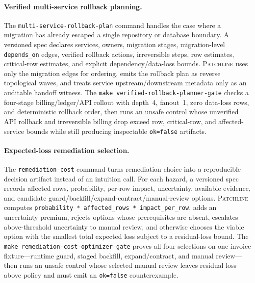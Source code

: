 \documentclass[11pt]{article}
\newcommand{\tool}{\textsc{Patchline}}
\newcommand{\code}[1]{\texttt{#1}}
\newcommand{\gate}[1]{\texttt{make #1}}
\begin{document}
\paragraph{Verified multi-service rollback planning.} The \code{multi-service-rollback-plan} command
handles the case where a migration has already escaped a single repository or database boundary. A
versioned spec declares services, owners, migration stages, migration-level \code{depends\_on} edges,
verified rollback actions, irreversible steps, row estimates, critical-row estimates, and explicit
dependency/data-loss bounds. \tool{} uses only the migration edges for ordering, emits the rollback plan
as reverse topological waves, and treats service upstream/downstream metadata only as an auditable
handoff witness. The \gate{verified-rollback-planner-gate} checks a four-stage billing/ledger/API
rollout with depth~4, fanout~1, zero data-loss rows, and deterministic rollback order, then runs an
unsafe control whose unverified API rollback and irreversible billing drop exceed row, critical-row, and
affected-service bounds while still producing inspectable \code{ok=false} artifacts.

\paragraph{Expected-loss remediation selection.} The \code{remediation-cost} command turns remediation
choice into a reproducible decision artifact instead of an intuition call. For each hazard, a versioned
spec records affected rows, probability, per-row impact, uncertainty, available evidence, and candidate
guard/backfill/expand-contract/manual-review options. \tool{} computes
\code{probability * affected\_rows * impact\_per\_row}, adds an uncertainty premium, rejects options
whose prerequisites are absent, escalates above-threshold uncertainty to manual review, and otherwise
chooses the viable option with the smallest total expected loss subject to a residual-loss bound. The
\gate{remediation-cost-optimizer-gate} proves all four selections on one invoice fixture---runtime
guard, staged backfill, expand/contract, and manual review---then runs an unsafe control whose selected
manual review leaves residual loss above policy and must emit an \code{ok=false} counterexample.
\end{document}
